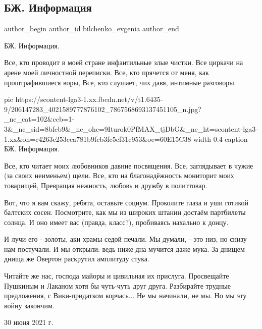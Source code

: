  
 
 
 
 
 
\subsection{БЖ. Информация}
\label{sec:30_06_2021.fb.bilchenko_evgenia.4.informacia}
\ifcmt
 author_begin
   author_id bilchenko_evgenia
 author_end
\fi

БЖ. Информация.

Все, кто проводит в моей стране инфантильные злые чистки.
Все циркачи на арене моей личностной переписки.
Все, кто прячется от меня, как проштрафившиеся воры,
Все, кто слушает, чих давя, интимные разговоры.

\ifcmt
  pic https://scontent-lga3-1.xx.fbcdn.net/v/t1.6435-9/206147283_4021589777876102_7867568693137451105_n.jpg?_nc_cat=102&ccb=1-3&_nc_sid=8bfeb9&_nc_ohc=9Iturok0PfMAX_tjDbG&_nc_ht=scontent-lga3-1.xx&oh=c4263c253cca781b9fcb3fc5cf31c953&oe=60E15C38
  width 0.4
  caption БЖ. Информация.
\fi

Все, кто читает моих любовников давние посвящения.
Все, заглядывает в чужие (за своих неименьем) щели.
Все, кто на благонадёжность мониторит моих товарищей,
Превращая нежность, любовь и дружбу в политтовар.

Вот, что я вам скажу, ребята, оставьте социум.
Проколите глаза и уши готикой балтских сосен.
Посмотрите, как мы из широких штанин достаём партбилеты солнца,
И оно имеет вас (правда, класс?), пробиваясь нахально к донцу.

И лучи его - золоты, аки храмы седой печали.
Мы думали, - это низ, но снизу нам постучали.
И мы открыли: ведь ниже дна мучится даже мука.
За днищем днища же Овертон раскрутил амплитуду стука.

Читайте же нас, господа майоры и цивильная их прислуга.
Просвещайте Пушкиным и Лаканом хотя бы чуть-чуть друг друга.
Разбирайте трудные предложения, с Вики-придатком корчась...
Не мы начинали, не мы. 
Но мы эту войну закончим.

30 июня 2021 г.
